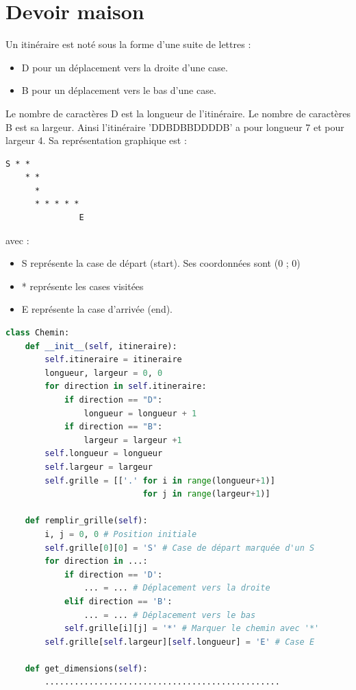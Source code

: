 \section*{Devoir maison }
Un itinéraire est noté sous la forme d’une suite de lettres :
\begin{itemize}
    \item D pour un déplacement vers la droite d’une case.
    \item B pour un déplacement vers le bas d’une case.
\end{itemize}
Le nombre de caractères D est la longueur de l’itinéraire. Le nombre de caractères B
est sa largeur.
Ainsi l’itinéraire 'DDBDBBDDDDB' a pour longueur 7 et pour largeur 4. Sa représentation
graphique est :
\begin{verbatim}
S * *
    * *
      *
      * * * * *
               E
\end{verbatim}
avec :
\begin{itemize}
    \item S représente la case de départ (start). Ses coordonnées sont (0 ; 0)
    \item * représente les cases visitées
    \item E représente la case d’arrivée (end).
\end{itemize}

\begin{lstlisting}[language=Python]
class Chemin:
    def __init__(self, itineraire):
        self.itineraire = itineraire
        longueur, largeur = 0, 0
        for direction in self.itineraire:
            if direction == "D":
                longueur = longueur + 1
            if direction == "B":
                largeur = largeur +1
        self.longueur = longueur
        self.largeur = largeur
        self.grille = [['.' for i in range(longueur+1)]
                            for j in range(largeur+1)]

    def remplir_grille(self):
        i, j = 0, 0 # Position initiale
        self.grille[0][0] = 'S' # Case de départ marquée d'un S
        for direction in ...:
            if direction == 'D':
                ... = ... # Déplacement vers la droite
            elif direction == 'B':
                ... = ... # Déplacement vers le bas
            self.grille[i][j] = '*' # Marquer le chemin avec '*'
        self.grille[self.largeur][self.longueur] = 'E' # Case E

    def get_dimensions(self):
        ................................................
\end{lstlisting}

